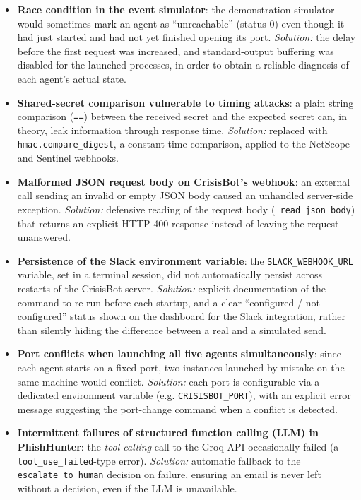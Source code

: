 \documentclass[12pt,a4paper]{report}
\newcommand{\code}[1]{\nolinkurl{#1}}
\begin{document}
\begin{itemize}[nosep]
\item \textbf{Race condition in the event simulator}: the demonstration simulator would sometimes mark an agent as ``unreachable'' (status 0) even though it had just started and had not yet finished opening its port. \emph{Solution:} the delay before the first request was increased, and standard-output buffering was disabled for the launched processes, in order to obtain a reliable diagnosis of each agent's actual state.
\item \textbf{Shared-secret comparison vulnerable to timing attacks}: a plain string comparison (\texttt{==}) between the received secret and the expected secret can, in theory, leak information through response time. \emph{Solution:} replaced with \texttt{hmac.compare\_digest}, a constant-time comparison, applied to the NetScope and Sentinel webhooks.
\item \textbf{Malformed JSON request body on CrisisBot's webhook}: an external call sending an invalid or empty JSON body caused an unhandled server-side exception. \emph{Solution:} defensive reading of the request body (\texttt{\_read\_json\_body}) that returns an explicit HTTP 400 response instead of leaving the request unanswered.
\item \textbf{Persistence of the Slack environment variable}: the \texttt{SLACK\_WEBHOOK\_URL} variable, set in a terminal session, did not automatically persist across restarts of the CrisisBot server. \emph{Solution:} explicit documentation of the command to re-run before each startup, and a clear ``configured / not configured'' status shown on the dashboard for the Slack integration, rather than silently hiding the difference between a real and a simulated send.
\item \textbf{Port conflicts when launching all five agents simultaneously}: since each agent starts on a fixed port, two instances launched by mistake on the same machine would conflict. \emph{Solution:} each port is configurable via a dedicated environment variable (e.g. \texttt{CRISISBOT\_PORT}), with an explicit error message suggesting the port-change command when a conflict is detected.
\item \textbf{Intermittent failures of structured function calling (LLM) in PhishHunter}: the \emph{tool calling} call to the Groq API occasionally failed (a \code{tool_use_failed}-type error). \emph{Solution:} automatic fallback to the \code{escalate_to_human} decision on failure, ensuring an email is never left without a decision, even if the LLM is unavailable.

\end{itemize}
\end{document}
